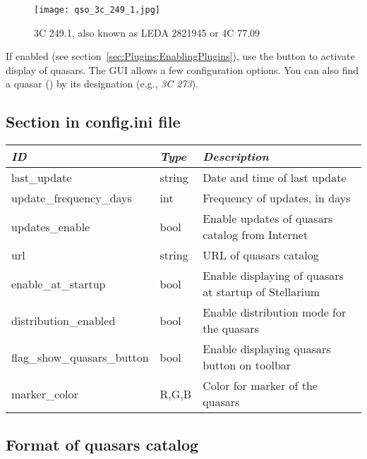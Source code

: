\begin{figure}[ht]
\texttt{[image: qso\_3c\_249\_1.jpg]}
\caption{3C 249.1, also known as LEDA 2821945 or 4C 77.09}
\label{fig:plugin:Quasars}
\end{figure}




If enabled (see section~\ref{sec:Plugins:EnablingPlugins}), use the
 button to activate display of
quasars. The GUI allows a few configuration options.  You can also
find a quasar () by its designation (e.g., \emph{3C 273}).

\subsection{Section  in config.ini file}

\begin{tabularx}{\textwidth}{l|l|X}\toprule
\emph{ID}               & \emph{Type} & \emph{Description}\\\midrule
last\_update                & string & Date and time of last update\\%
update\_frequency\_days     & int    & Frequency of updates, in days\\%
updates\_enable             & bool   & Enable updates of quasars catalog from Internet \\%
url                         & string & URL of quasars catalog \\%
enable\_at\_startup         & bool   & Enable displaying of quasars at startup of Stellarium \\%
distribution\_enabled       & bool   & Enable distribution mode for the quasars \\%
flag\_show\_quasars\_button & bool   & Enable displaying quasars button on toolbar \\%
marker\_color               & R,G,B  & Color for marker of the quasars \\\bottomrule
\end{tabularx}

\newpage
\subsection{Format of quasars catalog}
\label{sec:plugins:Quasars:format}

